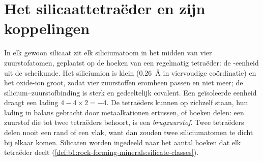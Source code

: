 \section{Het silicaattetraëder en zijn koppelingen}

In elk gewoon silicaat zit elk siliciumatoom in het midden van vier zuurstofatomen, geplaatst op de hoeken van een regelmatig
tetraëder: de -eenheid uit de scheikunde. Het siliciumion is klein (\qty{0.26}{\angstrom} in viervoudige coördinatie)
en het oxide-ion groot, zodat vier zuurstoffen eromheen passen en niet meer; de silicium--zuurstofbinding is sterk en
gedeeltelijk covalent. Een geïsoleerde eenheid draagt een lading $4 - 4\times2 = -4$.
De tetraëders kunnen op zichzelf staan, hun lading in balans gebracht door metaalkationen ertussen, of hoeken delen: een
zuurstof die tot twee tetraëders behoort, is een \emph{brugzuurstof}. Twee tetraëders delen nooit een
rand of een vlak, want dan zouden twee siliciumatomen te dicht bij elkaar komen. Silicaten worden ingedeeld naar het aantal
hoeken dat elk tetraëder deelt (\cref{def:b1:rock-forming-minerals:silicate-classes}).

